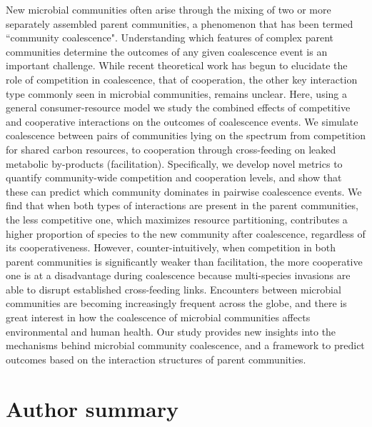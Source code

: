 \documentclass[10pt,letterpaper]{article}
\begin{document}
New microbial communities often arise through the mixing of two or more separately assembled parent communities, a phenomenon that has been termed ``community coalescence". Understanding which features of complex parent communities determine the outcomes of any given coalescence event is an important challenge. While recent theoretical work has begun to elucidate the role of competition in coalescence, that of cooperation, the other key interaction type commonly seen in microbial communities, remains unclear. Here, using a general consumer-resource model we study the combined effects of competitive and cooperative interactions on the outcomes of coalescence events. We simulate coalescence between pairs of communities lying on the spectrum from competition for shared carbon resources, to cooperation through cross-feeding on leaked metabolic by-products (facilitation). Specifically, we develop novel metrics to quantify community-wide competition and cooperation levels, and show that these can predict which community dominates in pairwise coalescence events. We find that when both types of interactions are present in the parent communities, the less competitive one, which maximizes resource partitioning, contributes a higher proportion of species to the new community after coalescence, regardless of its cooperativeness. However, counter-intuitively, when competition in both parent communities is significantly weaker than facilitation, the more cooperative one is at a disadvantage during coalescence because multi-species invasions are able to disrupt established cross-feeding links. Encounters between microbial communities are becoming increasingly frequent across the globe, and there is great interest in how the coalescence of microbial communities affects environmental and human health. Our study provides new insights into the mechanisms behind microbial community coalescence, and a framework to predict outcomes based on the interaction structures of parent communities.


\section*{Author summary}
\end{document}
